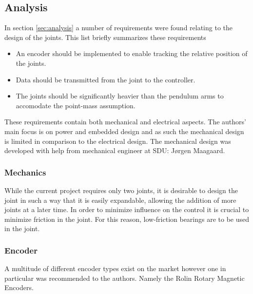 \subsection{Analysis} %
\label{sub:analysis}

In section \ref{sec:analysis} a number of requirements were found relating to the design of the joints.
This list briefly summarizes these requirements

\begin{itemize}
	\item An encoder should be implemented to enable tracking the relative position of the joints.
	\item Data should be transmitted from the joint to the controller.
	\item The joints should be significantly heavier than the pendulum arms to accomodate the point-mass assumption. 
\end{itemize}

These requirements contain both mechanical and electrical aspects.
The authors' main focus is on power and embedded design and as such the mechanical design is limited in comparison to the electrical design.
The mechanical design was developed with help from mechanical engineer at SDU: Jørgen Maagaard.

\subsubsection{Mechanics} %
\label{ssub:mechanics}
While the current project requires only two joints, it is desirable to design the joint in such a way that it is easily expandable, allowing the addition of more joints at a later time.
In order to minimize influence on the control it is crucial to minimize friction in the joint.
For this reason, low-friction bearings are to be used in the joint.

\subsubsection{Encoder} %
\label{ssub:encoder}
A multitude of different encoder types exist on the market however one in particular was recommended to the authors.
Namely the Rolin Rotary Magnetic Encoders.

